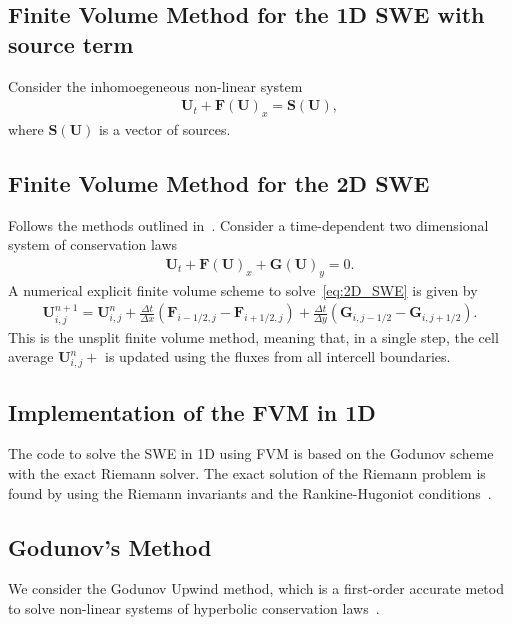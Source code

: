 \subsection{Finite Volume Method for the 1D SWE with source term}
Consider the inhomoegeneous non-linear system
\begin{align*}
    \mathbf{U}_t + \mathbf{F(U)}_x = \mathbf{S(U)},
\end{align*} 
where $\mathbf{S(U)}$ is a vector of sources. 



\subsection{Finite Volume Method for the 2D SWE}
Follows the methods outlined in~\cite{Toro2009-Riemann}.
Consider a time-dependent two dimensional system of conservation laws
\begin{align}\label{eq:2D_SWE}
    \mathbf{U}_t + \mathbf{F(U)}_x + \mathbf{G(U)}_y = 0.
\end{align}
A numerical explicit finite volume scheme to solve~\eqref{eq:2D_SWE} is given by
\begin{align}
    \mathbf{U}_{i,j}^{n+1} = \mathbf{U}_{i,j}^n + \frac{\Delta t}{\Delta x}(\mathbf{F}_{i-1/2,j} - \mathbf{F}_{i+1/2,j}) + \frac{\Delta t}{\Delta y}(\mathbf{G}_{i,j-1/2} - \mathbf{G}_{i,j+1/2}).
\end{align}
This is the unsplit finite volume method, meaning that, in a single step, the cell average $\mathbf{U}_{i,j}^n+$ is updated using the fluxes from all intercell boundaries.


\subsection{Implementation of the FVM in 1D}
The code to solve the SWE in 1D using FVM is based on the Godunov scheme with the exact Riemann solver.
The exact solution of the Riemann problem is found by using the Riemann invariants and the Rankine-Hugoniot conditions~\cite{trento_course}.

\subsection{Godunov's Method}
We consider the Godunov Upwind method, which is a first-order accurate metod to solve non-linear systems of hyperbolic conservation laws~\cite{Toro2024}.

